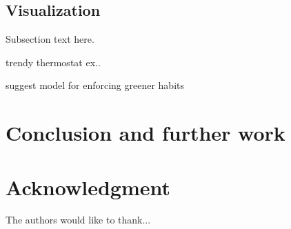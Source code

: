 \documentclass[journal]{IEEEtran}
\begin{document}
\subsection{Visualization}
Subsection text here.

trendy thermostat ex..

suggest model for enforcing greener habits
\section{Conclusion and further work}


\section*{Acknowledgment}


The authors would like to thank...







%
%
%
\end{document}
